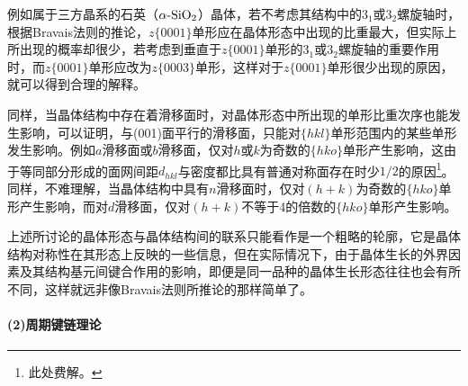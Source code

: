 例如属于三方晶系的石英（$\alpha\text{-}\rm SiO_2$）晶体，若不考虑其结构中的$3_1$或$3_2$螺旋轴时，根据Bravais法则的推论，$z\{0001\}$单形应在晶体形态中出现的比重最大，但实际上所出现的概率却很少，若考虑到垂直于$z\{0001\}$单形的$3_1$或$3_2$螺旋轴的重要作用时，而$z\{0001\}$单形应改为$z\{0003\}$单形，这样对于$z\{0001\}$单形很少出现的原因，就可以得到合理的解释。

同样，当晶体结构中存在着滑移面时，对晶体形态中所出现的单形比重次序也能发生影响，可以证明，与(001)面平行的滑移面，只能对$\{hkl\}$单形范围内的某些单形发生影响。例如$a$滑移面或$b$滑移面，仅对$h$或$k$为奇数的$\{hko\}$单形产生影响，这由于等同部分形成的面网间距$d_{hkl}$与密度都比具有普通对称面存在时少$1/2$的原因\footnote{此处费解。}。同样，不难理解，当晶体结构中具有$n$滑移面时，仅对$(h+k)$为奇数的$\{hko\}$单形产生影响，而对$d$滑移面，仅对$(h+k)$不等于4的倍数的$\{hko\}$单形产生影响。

上述所讨论的晶体形态与晶体结构间的联系只能看作是一个粗略的轮廓，它是晶体结构对称性在其形态上反映的一些信息，但在实际情况下，由于晶体生长的外界因素及其结构基元间键合作用的影响，即便是同一品种的晶体生长形态往往也会有所不同，这样就远非像Bravais法则所推论的那样简单了。

\paragraph{(2)周期键链理论}
